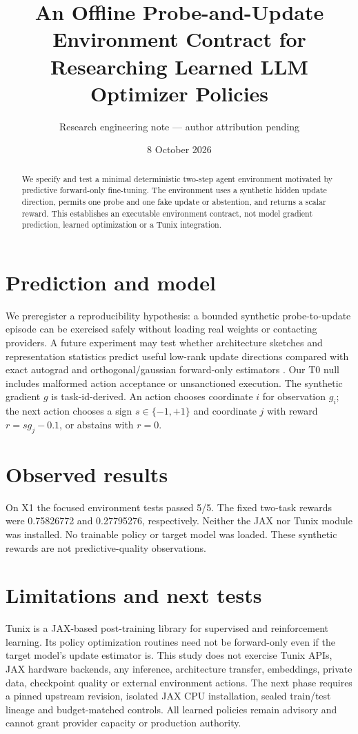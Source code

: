 \documentclass[10pt]{article}
\title{An Offline Probe-and-Update Environment Contract for Researching Learned LLM Optimizer Policies}
\author{Research engineering note --- author attribution pending}
\date{8 October 2026}
\begin{document}
\maketitle
\begin{abstract}
We specify and test a minimal deterministic two-step agent environment
motivated by predictive forward-only fine-tuning. The environment
uses a synthetic hidden update direction, permits one probe and one
fake update or abstention, and returns a scalar reward. This establishes
an executable environment contract, not model gradient prediction,
learned optimization or a Tunix integration.
\end{abstract}
\section{Prediction and model}
We preregister a reproducibility hypothesis: a bounded synthetic
probe-to-update episode can be exercised safely without loading real
weights or contacting providers. A future experiment may test whether
architecture sketches and representation statistics predict useful
low-rank update directions compared with exact autograd and
orthogonal/gaussian forward-only estimators \cite{parity}.
Our T0 null includes malformed action acceptance or unsanctioned
execution. The synthetic gradient $g$ is task-id-derived.
An action chooses coordinate $i$ for observation $g_i$; the next
action chooses a sign $s\in\{-1,+1\}$ and coordinate $j$ with
reward $r=s g_j-0.1$, or abstains with $r=0$.
\section{Observed results}
On X1 the focused environment tests passed 5/5.
The fixed two-task rewards were 0.75826772 and 0.27795276,
respectively. Neither the JAX nor Tunix module was installed.
No trainable policy or target model was loaded. These synthetic
rewards are not predictive-quality observations.
\section{Limitations and next tests}
Tunix \cite{tunix} is a JAX-based post-training library for supervised
and reinforcement learning. Its policy optimization routines need
not be forward-only even if the target model's update estimator is.
This study does not exercise Tunix APIs, JAX hardware backends,
any inference, architecture transfer, embeddings, private data,
checkpoint quality or external environment actions.
The next phase requires a pinned upstream revision, isolated JAX
CPU installation, sealed train/test lineage and budget-matched
controls. All learned policies remain advisory and cannot grant
provider capacity or production authority.
\end{document}
